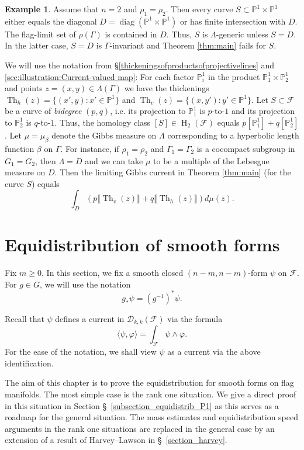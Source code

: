 \documentclass[12pt]{amsbook}%
\theoremstyle{definition}
\newtheorem{example}[thm]{Example}
\theoremstyle{remark}
\numberwithin{section}{chapter}
\numberwithin{subsection}{section}
\numberwithin{figure}{chapter}
\DeclareMathOperator{\Th}{Th}
\DeclareMathOperator{\coh}{H}
\DeclareMathOperator{\diag}{diag}
\def\P{{\mathbb{P}}}
\def\cD{{\mathscr{D}}}
\def\cF{{\mathscr{F}}}
\def\Ga{\Gamma}
\def\La{\Lambda}
\def\kap{}
\begin{document}
{{\begin{example}
Assume that $n=2$ and $\rho_1=\rho_2$. Then every curve 
$S\subset \P^1\times \P^1$ either equals the diagonal $D=\diag(\P^1\times \P^1)$ or has finite intersection with 
$D$. The flag-limit set of $\rho(\Ga)$ is contained in $D$. Thus, $S$ is $\La$-generic unless $S=D$. In the latter case, $S=D$ is 
$\Ga$-invariant and Theorem \ref{thm:main} fails for $S$. %

We will use the notation from \S \ref{thickeningsofproductsofprojectivelines} and \ref{sec:illustration:Current-valued map}: For each factor $\P^1_i$ in the product $\P_1^1\times \P_2^1$ and points 
$z=(x,y)\in \La(\Ga)$ we have the thickenings $\Th_h(z)= \{(x', y): x'\in \P^1\}$ and $\Th_v(z)= \{(x, y'): y'\in \P^1\}$. Let $S\subset \cF$ be a curve of 
{\em bidegree} $(p,q)$, i.e. its projection to $\P^1_1$ is $p$-to-$1$ and its projection to $\P^1_2$ is $q$-to-$1$. Thus, the homology class 
$[S]\in \coh_2(\cF)$ equals $p[\P^1_1] + q [\P^1_2]$. Let $\mu=\mu_\beta$ denote the Gibbs measure on $\La$ corresponding to a hyperbolic length function $\beta$ on 
$\Ga$. For instance, if $\rho_1=\rho_2$ and $\Ga_1=\Ga_2$ is a cocompact subgroup in $G_1=G_2$, then $\La=D$ and 
we can take $\mu$ to be a multiple of the Lebesgue measure on $D$. Then the limiting Gibbs current in Theorem \ref{thm:main} (for the curve $S$) equals
$$
\int_D \left( p\llbracket \Th_v(z)\rrbracket  + q \llbracket \Th_h(z)\rrbracket  \right)d\mu(z). 
$$
\end{example}



\chapter{Equidistribution of smooth forms}\label{sec:Equidistribution of smooth forms}


Fix $m \geqslant 0 $.
In this section, we fix a smooth closed $(n-m, n-m)$-form $\psi$ on $\mathcal{F}$. For $g\in G$, we will use the notation 
$$
g_*\psi=(g^{-1})^*\psi.
$$ 

Recall that $\psi$ defines a current in $  \cD_{k,k}(\cF)$ via the formula
\[
\langle \psi, \varphi\rangle=\int_\cF \psi \wedge \varphi.
\]
For the ease of the notation, we shall view $\psi$ as a current via the above identification.  


The aim of this chapter is to prove the equidistribution for smooth forms on flag manifolds. %
The most simple case is the rank one situation. We give a direct proof in this situation in Section \S~\ref{subsection_equidistrib_P1} as this serves as a roadmap for the general situation. The mass estimates and equidistribution speed arguments in the rank one situations are replaced in the general case by an extension of a result of Harvey--Lawson in \S~\ref{section_harvey}. 

}}
\end{document}
